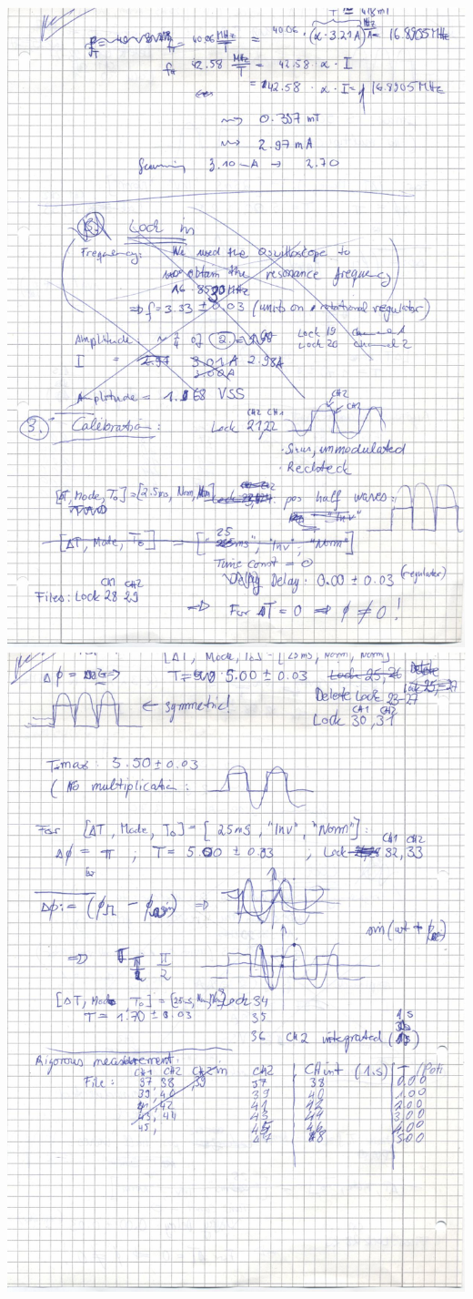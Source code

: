     \includegraphics[width=\linewidth]{appendix/spin6.jpg}
\clearpage
    \includegraphics[width=\linewidth]{appendix/spin7.jpg}
\clearpage

